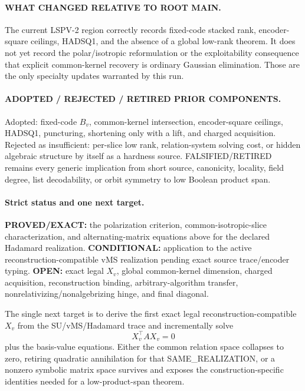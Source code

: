 \documentclass[11pt]{article}
\begin{document}
\paragraph{WHAT CHANGED RELATIVE TO ROOT MAIN.}
The current LSPV-2 region correctly records fixed-code stacked rank, encoder-square ceilings, HADSQ1, and the absence of a global low-rank theorem. It does not yet record the polar/isotropic reformulation or the exploitability consequence that explicit common-kernel recovery is ordinary Gaussian elimination. Those are the only specialty updates warranted by this run.

\paragraph{ADOPTED / REJECTED / RETIRED PRIOR COMPONENTS.}
Adopted: fixed-code \(B_v\), common-kernel intersection, encoder-square ceilings, HADSQ1, puncturing, shortening only with a lift, and charged acquisition. Rejected as insufficient: per-slice low rank, relation-system solving cost, or hidden algebraic structure by itself as a hardness source. FALSIFIED/RETIRED remains every generic implication from short source, canonicity, locality, field degree, list decodability, or orbit symmetry to low Boolean product span.

\paragraph{Strict status and one next target.}
\textbf{PROVED/EXACT:} the polarization criterion, common-isotropic-slice characterization, and alternating-matrix equations above for the declared Hadamard realization. \textbf{CONDITIONAL:} application to the active reconstruction-compatible vMS realization pending exact source trace/encoder typing. \textbf{OPEN:} exact legal \(X_v\), global common-kernel dimension, charged acquisition, reconstruction binding, arbitrary-algorithm transfer, nonrelativizing/nonalgebrizing hinge, and final diagonal.

The single next target is to derive the first exact legal reconstruction-compatible \(X_v\) from the SU/vMS/Hadamard trace and incrementally solve
\[
X_v^\top A X_v=0
\]
plus the basis-value equations. Either the common relation space collapses to zero, retiring quadratic annihilation for that SAME\_REALIZATION, or a nonzero symbolic matrix space survives and exposes the construction-specific identities needed for a low-product-span theorem.
\end{document}
